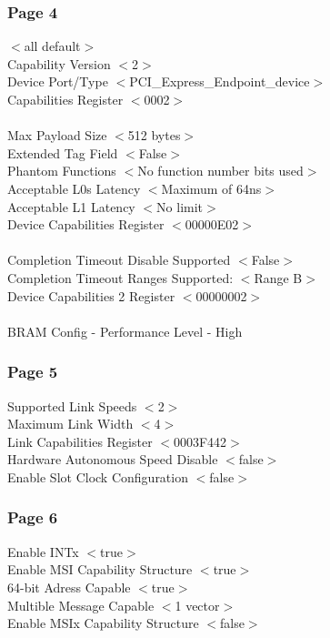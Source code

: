 \subsubsection{Page 4}

$<$all default$>$ \\
Capability Version $<$2$>$ \\
Device Port/Type $<$PCI\_Express\_Endpoint\_device$>$ \\
Capabilities Register $<$0002$>$  \\
\\
Max Payload Size $<$512 bytes$>$ \\
Extended Tag Field $<$False$>$ \\
Phantom Functions $<$No function number bits used$>$ \\
Acceptable L0s Latency $<$Maximum of 64ns$>$ \\
Acceptable L1 Latency $<$No limit$>$ \\
Device Capabilities Register $<$00000E02$>$  \\
\\
Completion Timeout Disable Supported $<$False$>$ \\
Completion Timeout Ranges Supported: $<$Range B$>$ \\
Device Capabilities 2 Register $<$00000002$>$  \\
\\
BRAM Config - Performance Level - High \\


\subsubsection{Page 5}
Supported Link Speeds $<$2$>$ \\
Maximum Link Width $<$4$>$ \\
Link Capabilities Register $<$0003F442$>$ \\
Hardware Autonomous Speed Disable $<$false$>$ \\
Enable Slot Clock Configuration $<$false$>$ \\

\subsubsection{Page 6}
Enable INTx $<$true$>$  \\
Enable MSI Capability Structure $<$true$>$ \\
64-bit Adress Capable $<$true$>$ \\
Multible Message Capable $<$1 vector$>$  \\
Enable MSIx Capability Structure $<$false$>$ \\

